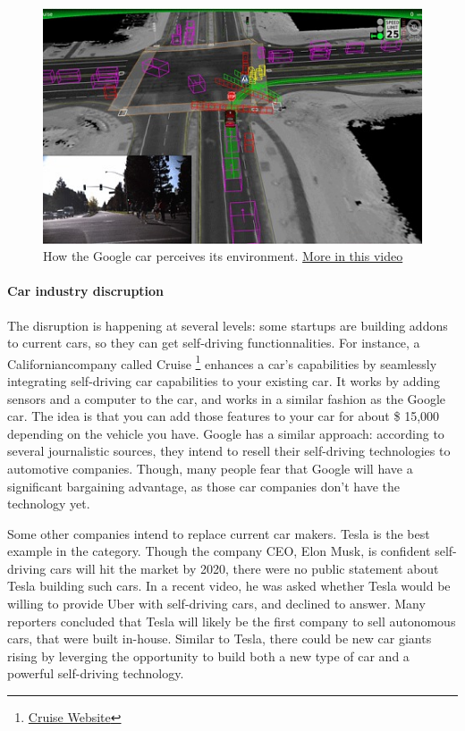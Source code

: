 \documentclass[12pt]{article}
\begin{document}
\smallskip

\begin{figure}[h]
    \centering
    \includegraphics[width=\linewidth]{google-car}
    \caption{How the Google car perceives its environment.
    \href{https://www.youtube.com/watch?v=dk3oc1Hr62g}{More in this video}}
    \label{fig:google_car}
\end{figure}


\smallskip

\paragraph{Car industry discruption}

The disruption is happening at several levels: some startups are building addons
to current cars, so they can get self-driving functionnalities. For instance,
a Californiancompany called Cruise
\footnote{\href{http://www.getcruise.com}{Cruise Website}}
enhances a car's capabilities by seamlessly integrating self-driving car
capabilities to your existing car. It works by adding sensors and a computer to
the car, and works in a similar fashion as the Google car. The idea is that you
can add those features to your car for about \$ 15,000 depending on the vehicle
you have. Google has a similar approach: according to several journalistic
sources, they intend to resell their self-driving technologies to automotive
companies. Though, many people fear that Google will have a significant
bargaining advantage, as those car companies don't have the technology yet.

Some other companies intend to replace current car makers. Tesla is the best
example in the category. Though the company CEO, Elon Musk, is confident
self-driving cars will hit the market by 2020, there were no public statement
about Tesla building such cars. In a recent video, he was asked whether Tesla
would be willing to provide Uber with self-driving cars, and declined to answer.
Many reporters concluded that Tesla will likely be the first company to sell
autonomous cars, that were built in-house. Similar to Tesla, there could be new
car giants rising by leverging the opportunity to build both a new type of car
and a powerful self-driving technology.
\end{document}
